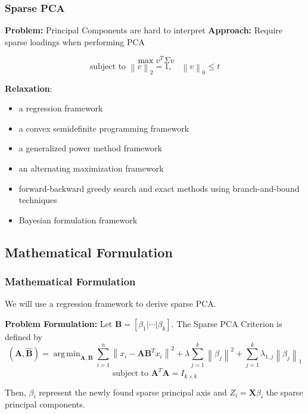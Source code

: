 \documentclass{beamer}
\theoremstyle{plain}
\theoremstyle{definition}
\newcommand{\mat}[1]{\mathbf{#1}}
\DeclareMathOperator*{\argmin}{arg\,min}
\newcommand{\norm}[1]{\left\lVert #1 \right\rVert}
\begin{document}
\begin{frame}
\frametitle{Sparse PCA}
\textbf{Problem:} Principal Components are hard to interpret \linebreak
\textbf{Approach:} Require sparse loadings when performing PCA

$$\max{v^T \Sigma v}$$
$$\text{subject to } \norm{v}_2 = 1, \quad \norm{v}_{0} \leq t$$

\textbf{Relaxation}:
\begin{itemize}
\item a regression framework
\item a convex semidefinite programming framework
\item a generalized power method framework
\item an alternating maximization framework
\item forward-backward greedy search and exact methods using branch-and-bound techniques
\item Bayesian formulation framework
\end{itemize}
\end{frame}

\subsection{Mathematical Formulation}
\begin{frame}
\frametitle{Mathematical Formulation}
We will use a regression framework to derive sparse PCA.\linebreak

\textbf{Problem Formulation:}\linebreak
Let $\mat B = \left[ \beta_1 \big\vert \cdots \big\vert \beta_k \right]$. The Sparse PCA Criterion is defined by
$$(\hat{\mat{A}}, \hat{\mat{B}}) = \argmin_{\mat{A}, \mat{B}} \sum_{i=1}^{n} \norm{x_i - \mat{A}\mat{B}^Tx_i}^2 + \lambda \sum_{j=1}^{k}\norm{\beta_j}^2 + \sum_{j=1}^k \lambda_{1,j} \norm{\beta_j}_1$$
$$\text{subject to } \mat{A}^T\mat{A} = I_{k \times k}$$

Then, $\beta_i$ represent the newly found sparse principal axis and $Z_i = \mat X \beta_i$ the sparse principal components.
\end{frame}
\end{document}
